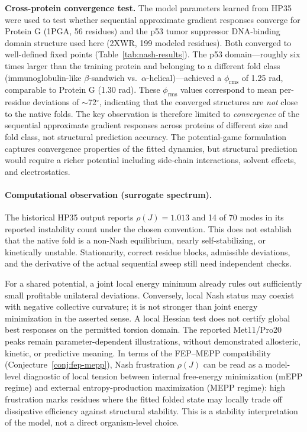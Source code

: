 \documentclass[12pt,a4paper]{article}
\theoremstyle{remark}
\begin{document}
\textbf{Cross-protein convergence test.} The model parameters learned from HP35 were used to test whether sequential approximate gradient responses converge for Protein G (1PGA, 56 residues) and the p53 tumor suppressor DNA-binding domain structure used here (2XWR, 199 modeled residues). Both converged to well-defined fixed points (Table~\ref{tab:nash-results}). The p53 domain---roughly six times larger than the training protein and belonging to a different fold class (immunoglobulin-like $\beta$-sandwich vs.\ $\alpha$-helical)---achieved a $\phi_{\text{rms}}$ of 1.25 rad, comparable to Protein G (1.30 rad). These $\phi_{\text{rms}}$ values correspond to mean per-residue deviations of $\sim$72$^\circ$, indicating that the converged structures are \emph{not} close to the native folds. The key observation is therefore limited to \emph{convergence} of the sequential approximate gradient responses across proteins of different size and fold class, not structural prediction accuracy. The potential-game formulation captures convergence properties of the fitted dynamics, but structural prediction would require a richer potential including side-chain interactions, solvent effects, and electrostatics.

\paragraph{Computational observation (surrogate spectrum).}
The historical HP35 output reports $\rho(J)=1.013$ and 14 of 70 modes in its reported instability count under the chosen convention. This does not establish that the native fold is a non-Nash equilibrium, nearly self-stabilizing, or kinetically unstable. Stationarity, correct residue blocks, admissible deviations, and the derivative of the actual sequential sweep still need independent checks.

For a shared potential, a joint local energy minimum already rules out sufficiently small profitable unilateral deviations. Conversely, local Nash status may coexist with negative collective curvature; it is not stronger than joint energy minimization in the asserted sense. A local Hessian test does not certify global best responses on the permitted torsion domain. The reported Met11/Pro20 peaks remain parameter-dependent illustrations, without demonstrated allosteric, kinetic, or predictive meaning.
In terms of the FEP--MEPP compatibility (Conjecture~\ref{conj:fep-mepp}), Nash frustration $\rho(J)$ can be read as a model-level diagnostic of local tension between internal free-energy minimization (mEPP regime) and external entropy-production maximization (MEPP regime): high frustration marks residues where the fitted folded state may locally trade off dissipative efficiency against structural stability. This is a stability interpretation of the model, not a direct organism-level choice.
\end{document}
